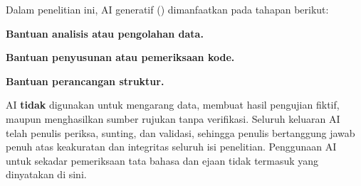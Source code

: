 Dalam penelitian ini, AI generatif () dimanfaatkan pada tahapan berikut:

\begin{daftarnomor}
    \item \textbf{Bantuan analisis atau pengolahan data.} 
    \item \textbf{Bantuan penyusunan atau pemeriksaan kode.} 
    \item \textbf{Bantuan perancangan struktur.} 
\end{daftarnomor}

AI \textbf{tidak} digunakan untuk mengarang data, membuat hasil pengujian fiktif,
maupun menghasilkan sumber rujukan tanpa verifikasi. Seluruh keluaran AI telah
penulis periksa, sunting, dan validasi, sehingga penulis bertanggung jawab penuh
atas keakuratan dan integritas seluruh isi penelitian. Penggunaan AI untuk sekadar
pemeriksaan tata bahasa dan ejaan tidak termasuk yang dinyatakan di sini.

